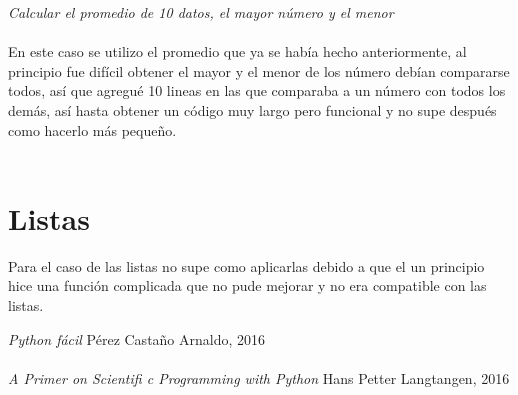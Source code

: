 \documentclass{book}
\begin{document}
	\textit{Calcular el promedio de 10 datos, el mayor número y el menor}\\
	\\
	En este caso se utilizo el promedio que ya se había hecho anteriormente, al principio fue difícil obtener el mayor y el menor de los número debían compararse todos, así que agregué 10 lineas en las que comparaba a un número con todos los demás, así hasta obtener un código muy largo pero funcional y no supe después como hacerlo más pequeño.\\
	\\
	\section*{Listas}
	Para el caso de las listas no supe como aplicarlas debido a que el un principio hice una función complicada que no pude mejorar y no era compatible con las listas.
	
	
	\begin{thebibliography}{9}
\textit{Python fácil}
		Pérez Castaño Arnaldo, 2016\\
		\\
\textit{A Primer on Scientifi c Programming with Python}
Hans Petter Langtangen, 2016
	
	\end{thebibliography}
	
\end{document}
